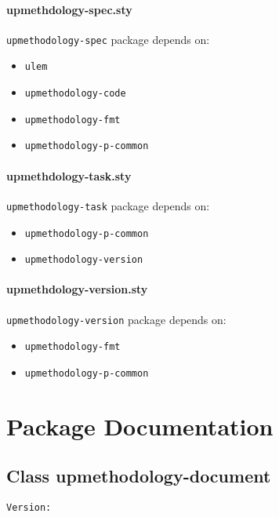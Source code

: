 \documentclass[book]{upmethodology-document}
\makeatletter
\let\VERdocclazz\upm@package@docclazz@ver
\makeatother
\begin{document}
\subsection{upmethdology-spec.sty}

\texttt{upmethodology-spec} package depends on:
\begin{itemize}
\item \texttt{ulem}
\item \texttt{upmethodology-code}
\item \texttt{upmethodology-fmt}
\item \texttt{upmethodology-p-common}
\end{itemize}

\subsection{upmethdology-task.sty}

\texttt{upmethodology-task} package depends on:
\begin{itemize}
\item \texttt{upmethodology-p-common}
\item \texttt{upmethodology-version}
\end{itemize}

\subsection{upmethdology-version.sty}

\texttt{upmethodology-version} package depends on:
\begin{itemize}
\item \texttt{upmethodology-fmt}
\item \texttt{upmethodology-p-common}
\end{itemize}

\part{Package Documentation}

\chapter{Class upmethodology-document}

\begin{center}
	\texttt{Version: \VERdocclazz}
\end{center}
\end{document}
